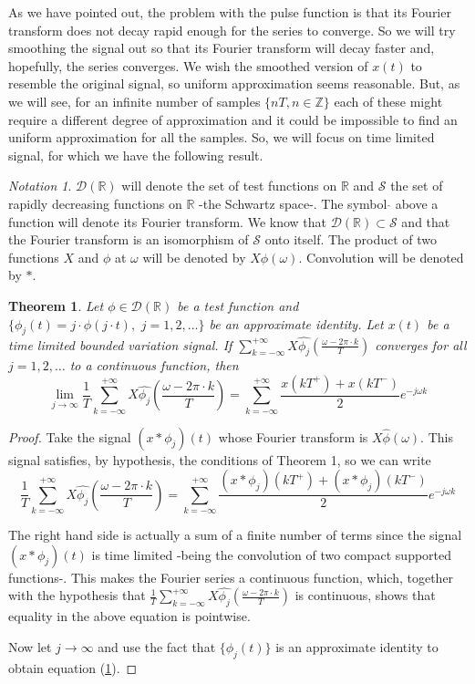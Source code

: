 \documentclass[12pt]{article}
\newtheorem{thm}{Theorem}
\theoremstyle{definition}
\theoremstyle{remark}
\newtheorem*{notat}{Notation}
\newcommand{\R}{\mathbb R}
\newcommand{\Z}{\mathbb Z}
\newcommand{\D}{\mathcal{D}}
\newcommand{\rapid}{\mathcal{S}}
\newcommand{\replica}[3]{\sum_{k=#2}^{#3} #1 \left(\frac{\omega- 2\pi \cdot k}{T}
\right)}
\newcommand{\DTFT}[1]{\sum_{k=-\infty}^{+\infty} \frac{#1(kT^+)+#1(kT^-)}{2} e^{-j\omega
k}}
\begin{document}
\bigskip

\noindent As we have pointed out, the problem with the pulse
function is that its Fourier transform does not decay rapid enough
for the series to converge. So we will try smoothing the signal out
so that its Fourier transform will decay faster and, hopefully, the
series converges. We wish the smoothed version of $x(t)$ to resemble
the original signal, so uniform approximation seems reasonable. But,
as we will see, for an infinite number of samples $\{nT, n \in \Z\}$
each of these might require a different degree of approximation and
it could be impossible to find an uniform approximation for all the
samples. So, we will focus on time limited signal, for which we have
the following result.

\begin{notat}
$\D(\R)$ will denote the set of test functions on $\R$ and $\rapid$
the set of rapidly decreasing functions on $\R$ -the Schwartz
space-. The symbol $\hat{}$ above a function will denote its Fourier
transform. We know that $\D(\R) \subset \rapid$ and that the Fourier
transform is an isomorphism of $\rapid$ onto itself. The product of
two functions $X$ and $\phi$ at $\omega$ will be denoted by
$X\phi(\omega)$. Convolution will be denoted by $\ast$.
\end{notat}

\medskip

\begin{thm}
Let $\phi \in \D(\R)$ be a test function and $\{\phi_j(t)=j \cdot
\phi(j \cdot t),\,\, j=1,2,\ldots \}$ be an approximate identity.
Let $x(t)$ be a time limited bounded variation signal. If
$\replica{X\hat{\phi_j}}{-\infty}{+\infty}$ converges for all
$j=1,2,\ldots$ to a continuous function, then \label{eq2}
\begin{equation}
\lim_{j \rightarrow \infty}\frac {1}{T}
\replica{X\hat{\phi_j}}{-\infty}{+\infty} = \DTFT{x}
\end{equation}
\end{thm}

\begin{proof}
Take the signal $(x \ast \phi_j)(t)$ whose Fourier transform is
$X\hat{\phi}(\omega)$. This signal satisfies, by hypothesis, the
conditions of Theorem 1, so we can write $$\frac {1}{T}
\replica{X\hat{\phi_j}}{-\infty}{+\infty} = \DTFT{(x \ast \phi_j)}
$$

The right hand side is actually a sum of a finite number of terms
since the signal $(x \ast \phi_j)(t)$ is time limited -being the
convolution of two compact supported functions-. This makes the
Fourier series a continuous function, which, together with the
hypothesis that $\frac {1}{T}
\replica{X\hat{\phi_j}}{-\infty}{+\infty}$ is continuous, shows that
equality in the above equation is pointwise.

\noindent Now let $j \rightarrow \infty$ and use the fact that
$\{\phi_j(t)\}$ is an approximate identity to obtain equation
(\ref{eq2}).
\end{proof}
\end{document}
